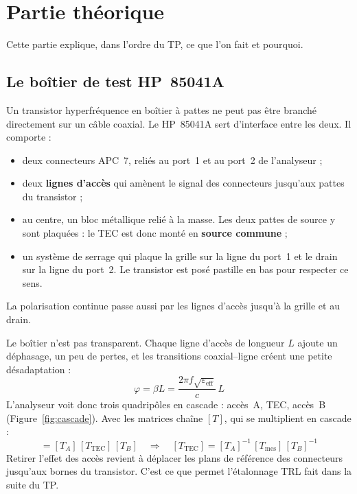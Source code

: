 \documentclass[12pt,a4paper]{article}
\begin{document}
\section{Partie théorique}

Cette partie explique, dans l’ordre du TP, ce que l’on fait et pourquoi.

\subsection{Le boîtier de test HP~85041A}

Un transistor hyperfréquence en boîtier à pattes ne peut pas être branché directement sur un
câble coaxial. Le HP~85041A sert d’interface entre les deux. Il comporte :
\begin{itemize}
  \item deux connecteurs APC~7, reliés au port~1 et au port~2 de l’analyseur ;
  \item deux \textbf{lignes d’accès} qui amènent le signal des connecteurs jusqu’aux pattes du
        transistor ;
  \item au centre, un bloc métallique relié à la masse. Les deux pattes de source y sont
        plaquées : le TEC est donc monté en \textbf{source commune} ;
  \item un système de serrage qui plaque la grille sur la ligne du port~1 et le drain sur la
        ligne du port~2. Le transistor est posé pastille en bas pour respecter ce sens.
\end{itemize}
La polarisation continue passe aussi par les lignes d’accès jusqu’à la grille et au drain.

Le boîtier n’est pas transparent. Chaque ligne d’accès de longueur $L$ ajoute un déphasage,
un peu de pertes, et les transitions coaxial–ligne créent une petite désadaptation :
\begin{equation}
  \varphi = \beta L = \frac{2\pi f \sqrt{\varepsilon_{\mathrm{eff}}}}{c}\,L
  \label{eq:phi}
\end{equation}
L’analyseur voit donc trois quadripôles en cascade : accès~A, TEC, accès~B
(Figure~\ref{fig:cascade}). Avec les matrices chaîne $[T]$, qui se multiplient en cascade :
\begin{equation}
  [T_{\mathrm{mes}}] = [T_A]\,[T_{\mathrm{TEC}}]\,[T_B]
  \quad\Longrightarrow\quad
  [T_{\mathrm{TEC}}] = [T_A]^{-1}\,[T_{\mathrm{mes}}]\,[T_B]^{-1}
  \label{eq:cascade}
\end{equation}
Retirer l’effet des accès revient à déplacer les plans de référence des connecteurs jusqu’aux
bornes du transistor. C’est ce que permet l’étalonnage TRL fait dans la suite du TP.
\end{document}
